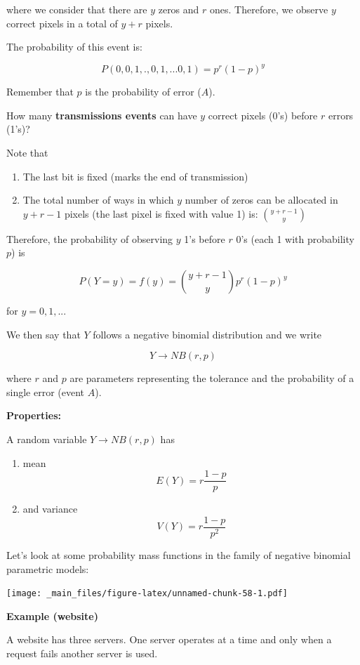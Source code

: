 \documentclass[
]{book}
\begin{document}
where we consider that there are \(y\) zeros and \(r\) ones. Therefore, we observe \(y\) correct pixels in a total of \(y + r\) pixels.

The probability of this event is:

\[P(0,0,1,., 0,1,...0,1)=p^r(1-p)^y\]

Remember that \(p\) is the probability of error (\(A\)).

How many \textbf{transmissions events} can have \(y\) correct pixels (0's) before \(r\) errors (1's)?

Note that

\begin{enumerate}
\def\labelenumi{\arabic{enumi})}
\item
  The last bit is fixed (marks the end of transmission)
\item
  The total number of ways in which \(y\) number of zeros can be allocated in \(y + r-1\) pixels (the last pixel is fixed with value 1) is: \(\binom {y + r-1} y\)
\end{enumerate}

Therefore, the probability of observing \(y\) 1's before \(r\) 0's (each 1 with probability \(p\)) is

\[P(Y=y)=f(y)=\binom {y+r-1} y p^r(1-p)^y\]

for \(y=0,1,...\)

We then say that \(Y\) follows a negative binomial distribution and we write

\[Y\rightarrow NB(r,p)\]

where \(r\) and \(p\) are parameters representing the tolerance and the probability of a single error (event \(A\)).

\textbf{Properties:}

A random variable \(Y\rightarrow NB(r,p)\) has

\begin{enumerate}
\def\labelenumi{\arabic{enumi})}
\item
  mean \[E(Y)= r\frac{1-p}{p}\]
\item
  and variance \[V(Y)= r\frac{1-p}{p^2}\]
\end{enumerate}

Let's look at some probability mass functions in the family of negative binomial parametric models:

\texttt{[image: \_main\_files/figure-latex/unnamed-chunk-58-1.pdf]}

\textbf{Example (website)}

A website has three servers. One server operates at a time and only when a request fails another server is used.
\end{document}
